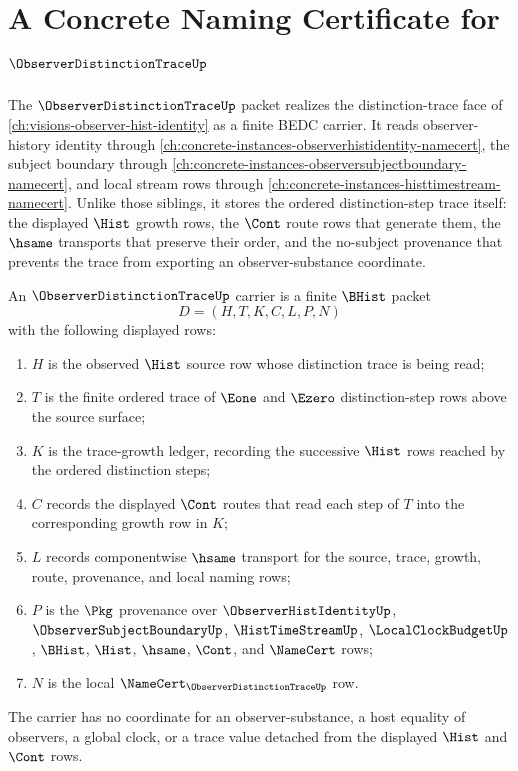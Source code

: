 \chapter{A Concrete Naming Certificate for $\ObserverDistinctionTraceUp$}
\label{ch:concrete-instances-observer-distinction-trace-namecert}

The $\ObserverDistinctionTraceUp$ packet realizes the distinction-trace face of \autoref{ch:visions-observer-hist-identity} as a finite BEDC carrier. It reads observer-history identity through \autoref{ch:concrete-instances-observerhistidentity-namecert}, the subject boundary through \autoref{ch:concrete-instances-observersubjectboundary-namecert}, and local stream rows through \autoref{ch:concrete-instances-histtimestream-namecert}. Unlike those siblings, it stores the ordered distinction-step trace itself: the displayed $\Hist$ growth rows, the $\Cont$ route rows that generate them, the $\hsame$ transports that preserve their order, and the no-subject provenance that prevents the trace from exporting an observer-substance coordinate.

\begin{definition}
\label{def:observer-distinction-trace-carrier}
An $\ObserverDistinctionTraceUp$ carrier is a finite $\BHist$ packet
$$
D=(H,T,K,C,L,P,N)
$$
with the following displayed rows:
\begin{enumerate}
\item $H$ is the observed $\Hist$ source row whose distinction trace is being read;
\item $T$ is the finite ordered trace of $\Eone$ and $\Ezero$ distinction-step rows above the source surface;
\item $K$ is the trace-growth ledger, recording the successive $\Hist$ rows reached by the ordered distinction steps;
\item $C$ records the displayed $\Cont$ routes that read each step of $T$ into the corresponding growth row in $K$;
\item $L$ records componentwise $\hsame$ transport for the source, trace, growth, route, provenance, and local naming rows;
\item $P$ is the $\Pkg$ provenance over $\ObserverHistIdentityUp$, $\ObserverSubjectBoundaryUp$, $\HistTimeStreamUp$, $\LocalClockBudgetUp$, $\BHist$, $\Hist$, $\hsame$, $\Cont$, and $\NameCert$ rows;
\item $N$ is the local $\NameCert_{\ObserverDistinctionTraceUp}$ row.
\end{enumerate}
The carrier has no coordinate for an observer-substance, a host equality of observers, a global clock, or a trace value detached from the displayed $\Hist$ and $\Cont$ rows.
\end{definition}

